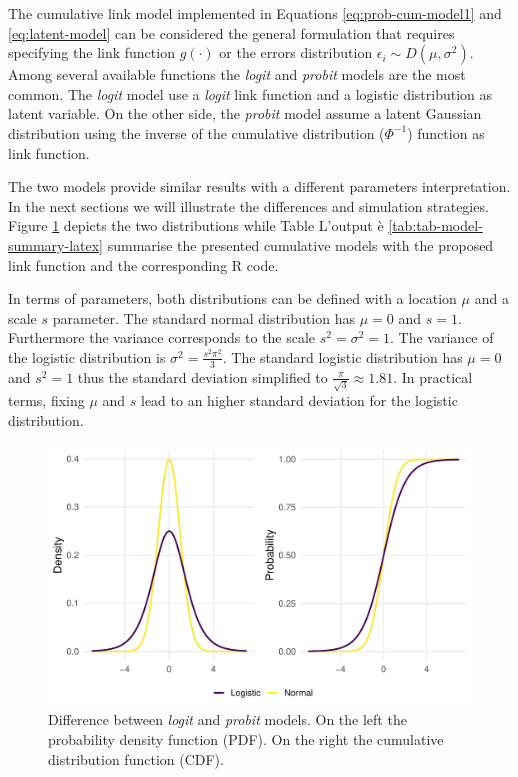 \documentclass[
  man, mask,floatsintext]{apa6}
\begin{document}
The cumulative link model implemented in Equations \eqref{eq:prob-cum-model1} and \eqref{eq:latent-model} can be considered the general formulation that requires specifying the link function \(g(\cdot)\) or the errors distribution \(\epsilon_i \sim D(\mu, \sigma^2)\). Among several available functions the \emph{logit} and \emph{probit} models are the most common. The \emph{logit} model use a \emph{logit} link function and a logistic distribution as latent variable. On the other side, the \emph{probit} model assume a latent Gaussian distribution using the inverse of the cumulative distribution (\(\Phi^{-1}\)) function as link function.

The two models provide similar results with a different parameters interpretation. In the next sections we will illustrate the differences and simulation strategies. Figure \ref{fig:fig-logit-vs-probit} depicts the two distributions while Table L'output è \ref{tab:tab-model-summary-latex} summarise the presented cumulative models with the proposed link function and the corresponding R code.

In terms of parameters, both distributions can be defined with a location \(\mu\) and a scale \(s\) parameter. The standard normal distribution has \(\mu = 0\) and \(s = 1\). Furthermore the variance corresponds to the scale \(s^2 = \sigma^2 = 1\). The variance of the logistic distribution is \(\sigma^2 = \frac{s^2\pi^2}{3}\). The standard logistic distribution has \(\mu = 0\) and \(s^2 = 1\) thus the standard deviation simplified to \(\frac{\pi}{\sqrt{3}} \approx 1.81\). In practical terms, fixing \(\mu\) and \(s\) lead to an higher standard deviation for the logistic distribution.

\scriptsize

\begin{figure}

{\centering \includegraphics[width=1\linewidth]{paper_files/figure-latex/fig-logit-vs-probit-1} 

}

\caption{Difference between \emph{logit} and \emph{probit} models. On the left the probability density function (PDF). On the right the cumulative distribution function (CDF).}\label{fig:fig-logit-vs-probit}
\end{figure}
\end{document}

